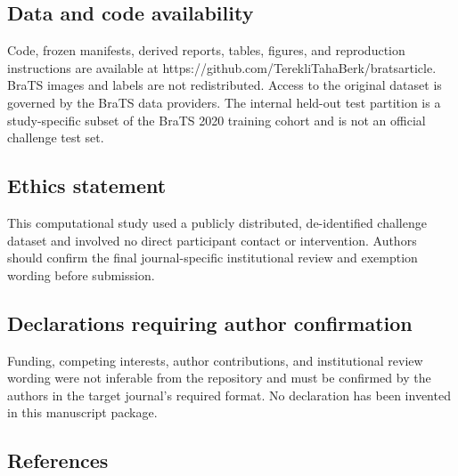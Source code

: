 \documentclass[
  10pt,
  letterpaper,
]{article}
\begin{document}
\subsection{Data and code
availability}\label{data-and-code-availability}

Code, frozen manifests, derived reports, tables, figures, and
reproduction instructions are available at
https://github.com/TerekliTahaBerk/bratsarticle. BraTS images and labels
are not redistributed. Access to the original dataset is governed by the
BraTS data providers. The internal held-out test partition is a
study-specific subset of the BraTS 2020 training cohort and is not an
official challenge test set.

\subsection{Ethics statement}\label{ethics-statement}

This computational study used a publicly distributed, de-identified
challenge dataset and involved no direct participant contact or
intervention. Authors should confirm the final journal-specific
institutional review and exemption wording before submission.

\subsection{Declarations requiring author
confirmation}\label{declarations-requiring-author-confirmation}

Funding, competing interests, author contributions, and institutional
review wording were not inferable from the repository and must be
confirmed by the authors in the target journal's required format. No
declaration has been invented in this manuscript package.

\subsection{References}\label{references}
\end{document}
